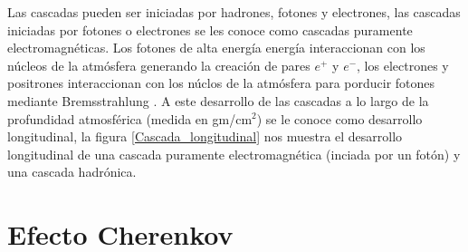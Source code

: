 	Las cascadas pueden ser iniciadas por hadrones, fotones y electrones, las cascadas iniciadas por fotones o electrones se les conoce como cascadas puramente electromagnéticas. Los fotones de alta energía energía interaccionan con los núcleos de la atmósfera generando la creación de pares $e^+$ y $e^-$, los electrones y positrones interaccionan con los núclos de la atmósfera para porducir fotones mediante Bremsstrahlung \cite{MOLLERACH201885}. A este desarrollo de las cascadas a lo largo de la profundidad atmosférica (medida en gm/cm$^2$) se le conoce como desarrollo longitudinal, la figura \ref{Cascada_longitudinal} nos muestra el desarrollo longitudinal de una cascada puramente electromagnética (inciada por un fotón) y una cascada hadrónica.

\section{Efecto Cherenkov} \label{EFECTO_CHERENKOV}
